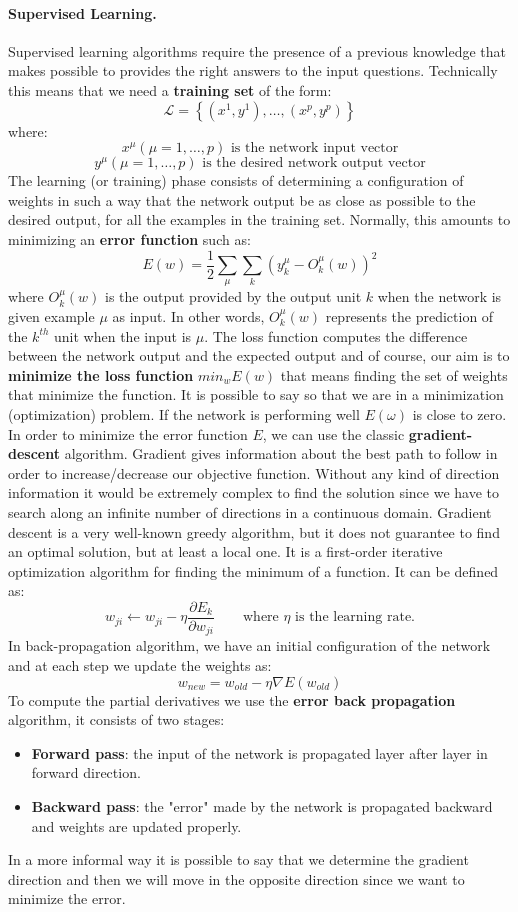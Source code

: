 \paragraph*{Supervised Learning.} Supervised learning algorithms require the presence of a previous knowledge that makes possible to provides the right answers to the input questions. Technically this means that we need a \textbf{training set} of the form:
$$\mathcal{L} =\left\{\left(x^1, y^1 \right), \dots , \left(x^p, y ^p \right) \right\}$$
where:
$$x^\mu (\mu=1,\dots, p) \text{ is the network input vector}$$
$$y^\mu (\mu=1,\dots, p) \text{ is the desired network output vector}$$
The learning (or training) phase consists of determining a configuration of weights in such a way that the network output be as close as possible to the desired output, for all the examples in the training set. Normally, this amounts to minimizing an \textbf{error function} such as:
$$E(w) = \frac{1}{2} \sum_{\mu} \sum_{k} \left(y_k^\mu - O_k^\mu(w)\right)^2$$
where $O_k^\mu(w)$ is the output provided by the output unit $k$ when the network is given example $\mu$ as input. In other words, $O_k^\mu(w)$ represents the prediction of the $k^{th}$ unit when the input is $\mu$. The loss function computes the difference between the network output and the expected output and of course, our aim is to \textbf{minimize the loss function} $min_w E(w)$ that means finding the set of weights that minimize the function. It is possible to say so that we are in a minimization (optimization) problem. If the network is performing well $E(\omega)$ is close to zero.\\
In order to minimize the error function $E$, we can use the classic \textbf{gradient-descent} algorithm. Gradient gives information about the best path to follow in order to increase/decrease our objective function. Without any kind of direction information it would be extremely complex to find the solution since we have to search along an infinite number of directions in a continuous domain. Gradient descent is a very well-known greedy algorithm, but it does not guarantee to find an optimal solution, but at least a local one. It is a first-order iterative optimization algorithm for finding the minimum of a function. It can be defined as:
$$w_{ji} \leftarrow w_{ji} - \eta \frac{\partial E_k}{\partial w_{ji}} \qquad \text{where } \eta \text{ is the learning rate.}$$
In back-propagation algorithm, we have an initial configuration of the network and at each step we update the weights as:
$$w_{new} = w_{old} - \eta \nabla E(w_{old})$$
To compute the partial derivatives we use the \textbf{error back propagation} algorithm, it consists of two stages:
\begin{itemize}
	\item \textbf{Forward pass}: the input of the network is propagated layer after layer in forward direction.
	\item \textbf{Backward pass}: the "error" made by the network is propagated backward and weights are updated properly.
\end{itemize}
In a more informal way it is possible to say that we determine the gradient direction and then we will move in the opposite direction since we want to minimize the error.


